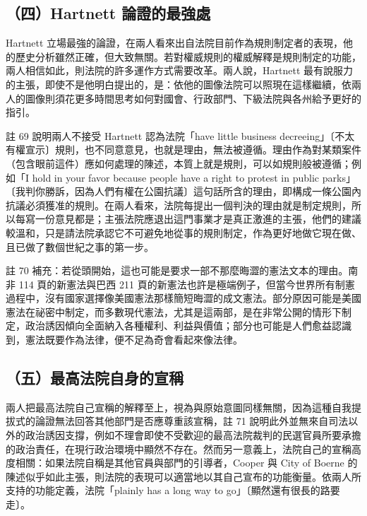 \subsection{（四）Hartnett 論證的最強處}

Hartnett 立場最強的論證，在兩人看來出自法院目前作為規則制定者的表現，他的歷史分析雖然正確，但大致無關。若對權威規則的權威解釋是規則制定的功能，兩人相信如此，則法院的許多運作方式需要改革。兩人說，Hartnett 最有說服力的主張，即使不是他明白提出的，是：依他的圖像法院可以照現在這樣繼續，依兩人的圖像則須花更多時間思考如何對國會、行政部門、下級法院與各州給予更好的指引。

註 69 說明兩人不接受 Hartnett 認為法院「have little business decreeing」〔不太有權宣示〕規則，也不同意意見，也就是理由，無法被遵循。理由作為對某類案件（包含眼前這件）應如何處理的陳述，本質上就是規則，可以如規則般被遵循；例如「I hold in your favor because people have a right to protest in public parks」〔我判你勝訴，因為人們有權在公園抗議〕這句話所含的理由，即構成一條公園內抗議必須獲准的規則。在兩人看來，法院每提出一個判決的理由就是制定規則，所以每寫一份意見都是；主張法院應退出這門事業才是真正激進的主張，他們的建議較溫和，只是請法院承認它不可避免地從事的規則制定，作為更好地做它現在做、且已做了數個世紀之事的第一步。

註 70 補充：若從頭開始，這也可能是要求一部不那麼晦澀的憲法文本的理由。南非 114 頁的新憲法與巴西 211 頁的新憲法也許是極端例子，但當今世界所有制憲過程中，沒有國家選擇像美國憲法那樣簡短晦澀的成文憲法。部分原因可能是美國憲法在祕密中制定，而多數現代憲法，尤其是這兩部，是在非常公開的情形下制定，政治誘因傾向全面納入各種權利、利益與價值；部分也可能是人們愈益認識到，憲法既要作為法律，便不足為奇會看起來像法律。

\subsection{（五）最高法院自身的宣稱}

兩人把最高法院自己宣稱的解釋至上，視為與原始意圖同樣無關，因為這種自我提拔式的論證無法回答其他部門是否應尊重該宣稱，註 71 說明此外並無來自司法以外的政治誘因支撐，例如不理會即使不受歡迎的最高法院裁判的民選官員所要承擔的政治責任，在現行政治環境中顯然不存在。然而另一意義上，法院自己的宣稱高度相關：如果法院自稱是其他官員與部門的引導者，Cooper 與 City of Boerne 的陳述似乎如此主張，則法院的表現可以適當地以其自己宣布的功能衡量。依兩人所支持的功能定義，法院「plainly has a long way to go」〔顯然還有很長的路要走〕。

